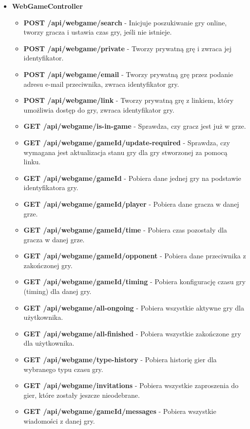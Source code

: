 \documentclass[12pt,a4paper]{article}
\begin{document}
\begin{itemize}
\newpage

    \item \textbf{WebGameController}
    \begin{itemize} 
        \item \textbf{POST /api/webgame/search} - Inicjuje poszukiwanie gry online, tworzy gracza i ustawia czas gry, jeśli nie istnieje. 
        \item \textbf{POST /api/webgame/private} - Tworzy prywatną grę i zwraca jej identyfikator. 
        \item \textbf{POST /api/webgame/email} - Tworzy prywatną grę przez podanie adresu e-mail przeciwnika, zwraca identyfikator gry. 
        \item \textbf{POST /api/webgame/link} - Tworzy prywatną grę z linkiem, który umożliwia dostęp do gry, zwraca identyfikator gry. 
        \item \textbf{GET /api/webgame/is-in-game} - Sprawdza, czy gracz jest już w grze. 
        \item \textbf{GET /api/webgame/{gameId}/update-required} - Sprawdza, czy wymagana jest aktualizacja stanu gry dla gry stworzonej za pomocą linku. 
        \item \textbf{GET /api/webgame/{gameId}} - Pobiera dane jednej gry na podstawie identyfikatora gry. 
        \item \textbf{GET /api/webgame/{gameId}/player} - Pobiera dane gracza w danej grze. 
        \item \textbf{GET /api/webgame/{gameId}/time} - Pobiera czas pozostały dla gracza w danej grze. 
        \item \textbf{GET /api/webgame/{gameId}/opponent} - Pobiera dane przeciwnika z zakończonej gry. 
        \item \textbf{GET /api/webgame/{gameId}/timing} - Pobiera konfigurację czasu gry (timing) dla danej gry. 
        \item \textbf{GET /api/webgame/all-ongoing} - Pobiera wszystkie aktywne gry dla użytkownika. 
        \item \textbf{GET /api/webgame/all-finished} - Pobiera wszystkie zakończone gry dla użytkownika. 
        \item \textbf{GET /api/webgame/type-history} - Pobiera historię gier dla wybranego typu czasu gry. 
        \item \textbf{GET /api/webgame/invitations} - Pobiera wszystkie zaproszenia do gier, które zostały jeszcze nieodebrane. 
        \item \textbf{GET /api/webgame/{gameId}/messages} - Pobiera wszystkie wiadomości z danej gry. 

\end{itemize}
\end{itemize}
\end{document}
